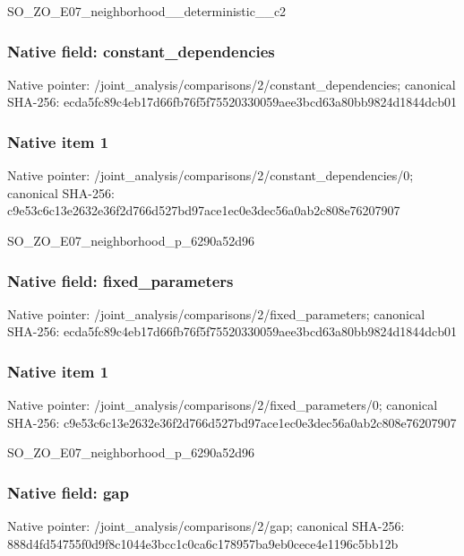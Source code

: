 \documentclass[10pt,a4paper]{article}
\begin{document}
\begingroup\raggedright\sloppy SO\_\allowbreak{}ZO\_\allowbreak{}E07\_\allowbreak{}neighborhood\_\allowbreak{}\_\allowbreak{}deterministic\_\allowbreak{}\_\allowbreak{}c2\par\endgroup

\subsubsection{Native field: constant\_\allowbreak{}dependencies}
Native pointer: /joint\_\allowbreak{}analysis/comparisons/2/constant\_\allowbreak{}dependencies; canonical SHA-256: ecda5fc89c4eb17d66fb76f5f75520330059aee3bcd63a80bb9824d1844dcb01

\subsubsection{Native item 1}
Native pointer: /joint\_\allowbreak{}analysis/comparisons/2/constant\_\allowbreak{}dependencies/0; canonical SHA-256: c9e53c6c13e2632e36f2d766d527bd97ace1ec0e3dec56a0ab2c808e76207907

\begingroup\raggedright\sloppy SO\_\allowbreak{}ZO\_\allowbreak{}E07\_\allowbreak{}neighborhood\_\allowbreak{}p\_\allowbreak{}6290a52d96\par\endgroup

\subsubsection{Native field: fixed\_\allowbreak{}parameters}
Native pointer: /joint\_\allowbreak{}analysis/comparisons/2/fixed\_\allowbreak{}parameters; canonical SHA-256: ecda5fc89c4eb17d66fb76f5f75520330059aee3bcd63a80bb9824d1844dcb01

\subsubsection{Native item 1}
Native pointer: /joint\_\allowbreak{}analysis/comparisons/2/fixed\_\allowbreak{}parameters/0; canonical SHA-256: c9e53c6c13e2632e36f2d766d527bd97ace1ec0e3dec56a0ab2c808e76207907

\begingroup\raggedright\sloppy SO\_\allowbreak{}ZO\_\allowbreak{}E07\_\allowbreak{}neighborhood\_\allowbreak{}p\_\allowbreak{}6290a52d96\par\endgroup

\subsubsection{Native field: gap}
Native pointer: /joint\_\allowbreak{}analysis/comparisons/2/gap; canonical SHA-256: 888d4fd54755f0d9f8c1044e3bcc1c0ca6c178957ba9eb0cece4e1196c5bb12b
\end{document}
